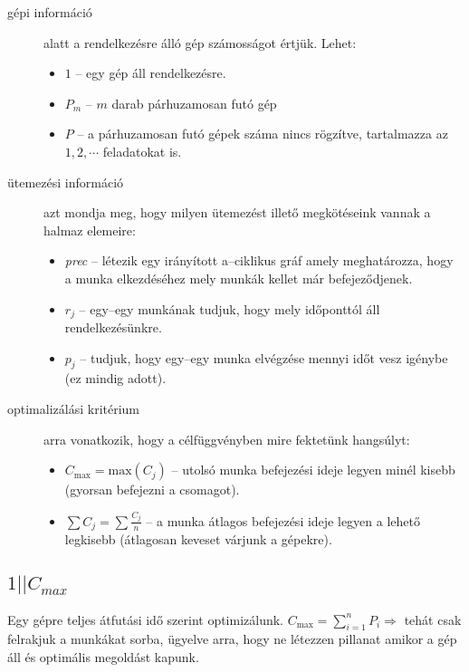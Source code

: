 \begin{description}
	\item[gépi információ] alatt a rendelkezésre álló gép számosságot értjük. Lehet:
	      \begin{itemize}
		      \item $1$ -- egy gép áll rendelkezésre.
		      \item $P_m$ -- $m$ darab párhuzamosan futó gép
		      \item $P$ -- a párhuzamosan futó gépek száma nincs rögzítve, tartalmazza az $1,2,\cdots$ feladatokat is.
	      \end{itemize}
	\item[ütemezési információ] azt mondja meg, hogy milyen ütemezést illető
	      megkötéseink vannak a halmaz elemeire:
	      \begin{itemize}
		      \item \emph{prec} -- létezik egy irányított a--ciklikus gráf amely
		            meghatározza, hogy a munka elkezdéséhez mely munkák kellet már befejeződjenek.
		      \item $r_j$ -- egy--egy munkának tudjuk, hogy mely időponttól áll rendelkezésünkre.
		      \item $p_j$ -- tudjuk, hogy egy--egy munka elvégzése mennyi időt vesz igénybe
		            (ez mindig adott).
	      \end{itemize}
	\item[optimalizálási kritérium] arra vonatkozik, hogy a célfüggvényben mire
	      fektetünk hangsúlyt:
	      \begin{itemize}
		      \item $C_{\mbox{max}}=\mbox{max}(C_j)$ -- utolsó munka befejezési ideje legyen minél
		            kisebb (gyorsan befejezni a csomagot).
		      \item $\sum C_j = \sum \frac{C_j}{n}$ -- a munka átlagos befejezési ideje
		            legyen a lehető legkisebb (átlagosan keveset várjunk a gépekre).
	      \end{itemize}
\end{description}

\subsection{ \texorpdfstring {$ 1||C_{max} $} {1||Cmax} }

Egy gépre teljes átfutási idő szerint optimizálunk. $C_{\mbox{max}}=\sum_{i=1}^{n}
	P_i \Rightarrow$ tehát csak felrakjuk a munkákat sorba, ügyelve arra, hogy ne
létezzen pillanat amikor a gép áll és optimális megoldást kapunk.

